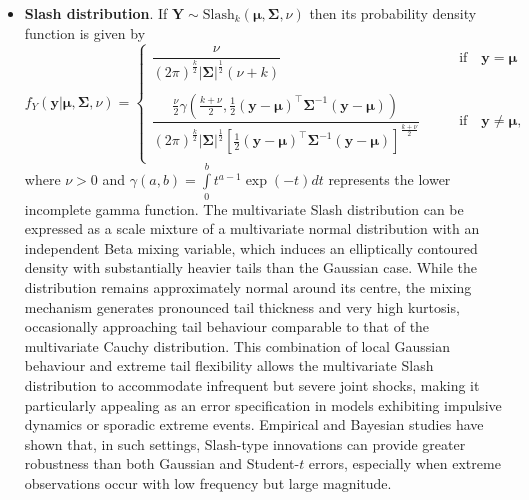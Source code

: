 \begin{itemize}
    \item {\bf Slash distribution}. If $\bm{Y}\sim\text{Slash}_k(\bm{\mu},\bm{\Sigma},\nu)$ then its probability density function is given by \citep{WG2006,MAAI17}
$$
f_{Y}(\bm{y}|\bm{\mu},\bm{\Sigma},\nu)=
\begin{cases}
\dfrac{\nu}{(2\pi)^{\frac{k}{2}}|\bm{\Sigma}|^{\frac{1}{2}}(\nu+k)} \qquad &\text{if}\quad \bm{y}=\bm{\mu}\\
\\
\dfrac{\frac{\nu}{2}\gamma(\frac{k+\nu}{2},\frac{1}{2}(\bm{y}-\bm{\mu})^{\!\top}\bm{\Sigma}^{-1}(\bm{y}-\bm{\mu}))}{(2\pi)^{\frac{k}{2}}|\bm{\Sigma}|^{\frac{1}{2}}\!\left[\frac{1}{2}(\bm{y}-\bm{\mu})^{\!\top}\bm{\Sigma}^{-1}(\bm{y}-\bm{\mu})\right]^{\frac{k+\nu}{2}}} \qquad &\text{if}\quad \bm{y}\neq\bm{\mu}, \\
\end{cases}
$$
where $\nu>0$ and $\gamma(a,b)=\int\limits_{0}^b t^{a-1}\exp(-t)dt$ represents the lower incomplete gamma function.
The multivariate Slash distribution can be expressed as a scale mixture of a multivariate normal distribution with an independent Beta mixing variable, which induces an elliptically contoured density with substantially heavier tails than the Gaussian case. While the distribution remains approximately normal around its centre, the mixing mechanism generates pronounced tail thickness and very high kurtosis, occasionally approaching tail behaviour comparable to that of the multivariate Cauchy distribution. This combination of local Gaussian behaviour and extreme tail flexibility allows the multivariate Slash distribution to accommodate infrequent but severe joint shocks, making it particularly appealing as an error specification in models exhibiting impulsive dynamics or sporadic extreme events. Empirical and Bayesian studies have shown that, in such settings, Slash-type innovations can provide greater robustness than both Gaussian and Student-$t$ errors, especially when extreme observations occur with low frequency but large magnitude.


\end{itemize}
